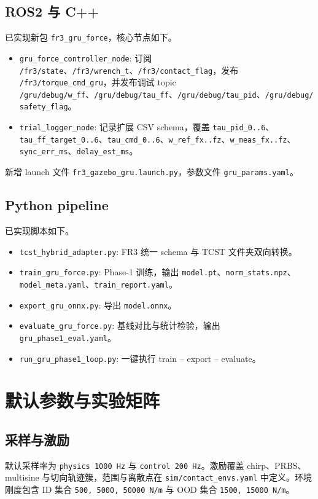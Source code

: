 \documentclass[11pt,a4paper]{article}
\begin{document}
\subsection{ROS2 与 C++}
已实现新包 \texttt{fr3\_gru\_force}，核心节点如下。
\begin{itemize}[leftmargin=1.2em]
  \item \texttt{gru\_force\_controller\_node}: 订阅 \texttt{/fr3/state}、\texttt{/fr3/wrench\_t}、\texttt{/fr3/contact\_flag}，发布 \texttt{/fr3/torque\_cmd\_gru}，并发布调试 topic \texttt{/gru/debug/w\_ff}、\texttt{/gru/debug/tau\_ff}、\texttt{/gru/debug/tau\_pid}、\texttt{/gru/debug/safety\_flag}。
  \item \texttt{trial\_logger\_node}: 记录扩展 CSV schema，覆盖 \texttt{tau\_pid\_0..6}、\texttt{tau\_ff\_target\_0..6}、\texttt{tau\_cmd\_0..6}、\texttt{w\_ref\_fx..fz}、\texttt{w\_meas\_fx..fz}、\texttt{sync\_err\_ms}、\texttt{delay\_est\_ms}。
\end{itemize}

新增 launch 文件 \texttt{fr3\_gazebo\_gru.launch.py}，参数文件 \texttt{gru\_params.yaml}。

\subsection{Python pipeline}
已实现脚本如下。
\begin{itemize}[leftmargin=1.2em]
  \item \texttt{tcst\_hybrid\_adapter.py}: FR3 统一 schema 与 TCST 文件夹双向转换。
  \item \texttt{train\_gru\_force.py}: Phase-1 训练，输出 \texttt{model.pt}、\texttt{norm\_stats.npz}、\texttt{model\_meta.yaml}、\texttt{train\_report.yaml}。
  \item \texttt{export\_gru\_onnx.py}: 导出 \texttt{model.onnx}。
  \item \texttt{evaluate\_gru\_force.py}: 基线对比与统计检验，输出 \texttt{gru\_phase1\_eval.yaml}。
  \item \texttt{run\_gru\_phase1\_loop.py}: 一键执行 train -- export -- evaluate。
\end{itemize}

\section{默认参数与实验矩阵}
\subsection{采样与激励}
默认采样率为 \texttt{physics 1000 Hz} 与 \texttt{control 200 Hz}。激励覆盖 chirp、PRBS、multisine 与切向轨迹簇，范围与离散点在 \texttt{sim/contact\_envs.yaml} 中定义。环境刚度包含 ID 集合 \texttt{500, 5000, 50000 N/m} 与 OOD 集合 \texttt{1500, 15000 N/m}。
\end{document}
